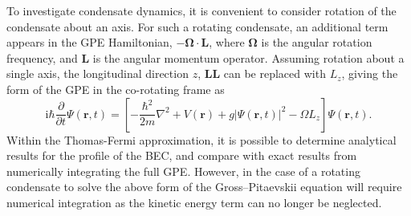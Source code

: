 To investigate condensate dynamics, it is convenient to consider rotation of the condensate about an axis. For such a rotating condensate, an additional term appears in the GPE Hamiltonian, $-\mathbf{\Omega}\cdot \mathbf{L}$, where $\mathbf{\Omega}$ is the angular rotation frequency, and $\mathbf{L}$ is the angular momentum operator. Assuming rotation about a single axis, the longitudinal direction $z$, $\mathbf{L}\mathbf{L}$ can be replaced with $L_z$, giving the form of the GPE in the co-rotating frame as
\begin{equation}\label{eqn:gpe_rotation}
\textrm{i}\hbar\frac{\partial}{\partial t}\Psi(\mathbf{r},t) = \left[-\frac{\hbar^2}{2m}\nabla^2 + V(\mathbf{r}) + g\vert\Psi(\textbf{r},t)\vert^2 - \Omega L_z  \right]\Psi(\mathbf{r},t).
\end{equation}
Within the Thomas-Fermi approximation, it is possible to determine analytical results for the profile of the BEC, and compare with exact results from numerically integrating the full GPE. However, in the case of a rotating condensate to solve the above form of the Gross--Pitaevskii equation will require numerical integration as the kinetic energy term can no longer be neglected.

